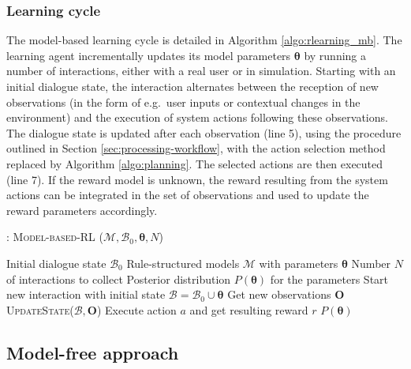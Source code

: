  
\subsubsection*{Learning cycle}

The model-based learning cycle is detailed in Algorithm \ref{algo:rlearning_mb}. The learning agent incrementally updates its model parameters $\boldsymbol\theta$  by running a number of interactions, either with a real user or in simulation. Starting with an initial dialogue state, the interaction alternates between the reception of new observations (in the form of e.g.\ user inputs or contextual changes in the environment) and the execution of system actions following these observations.  The dialogue state is updated after each observation (line 5), using the procedure outlined in Section \ref{sec:processing-workflow}, with the action selection method replaced by Algorithm \ref{algo:planning}. The selected actions are then executed (line 7).   If the reward model is unknown, the reward resulting from the system actions can be integrated in the set of observations and used to update the reward parameters accordingly. 

\begin{algorithm}[ht]
\caption{: \textsc{Model-based-RL} ($\mathcal{M}, \mathcal{B}_0, \boldsymbol\theta, N$)}
\begin{algorithmic}[1]\vspace{1mm}
\REQUIRE Initial dialogue state $\mathcal{B}_0$
\REQUIRE Rule-structured models $\mathcal{M}$ with parameters  $\boldsymbol\theta$
\REQUIRE Number $N$ of interactions to collect
\ENSURE Posterior distribution $P(\boldsymbol\theta)$ for the parameters  \vspace{1mm}
\STATE Start new interaction with initial state $\mathcal{B} = \mathcal{B}_0 \cup \boldsymbol\theta $
\STATE Get new observations $\mathbf{O}$
\STATE \textsc{UpdateState}($\mathcal{B}, \mathbf{O}$)
\STATE Execute action $a$ and get resulting reward $r$
\ENDIF
\ENDWHILE
\ENDFOR
\RETURN $P(\boldsymbol\theta)$
\end{algorithmic} 
\label{algo:rlearning_mb}
\end{algorithm}



\subsection{Model-free approach}
\label{sec:modelfree}

